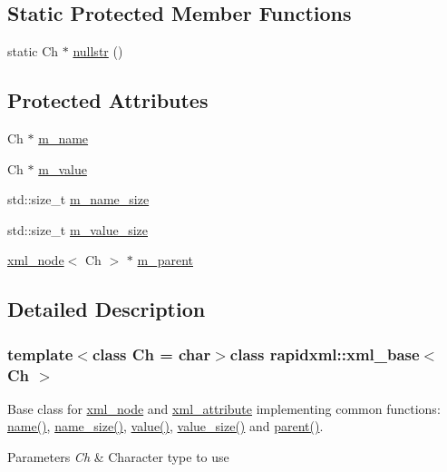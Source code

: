 \subsection*{Static Protected Member Functions}
\begin{DoxyCompactItemize}
\item 
static Ch $\ast$ \hyperlink{classrapidxml_1_1xml__base_ad96ff6b1e41dab3ff60b9bc4df769a75}{nullstr} ()
\end{DoxyCompactItemize}
\subsection*{Protected Attributes}
\begin{DoxyCompactItemize}
\item 
Ch $\ast$ \hyperlink{classrapidxml_1_1xml__base_afd9851ed43e14619db0d7075ef8e9e8a}{m\+\_\+name}
\item 
Ch $\ast$ \hyperlink{classrapidxml_1_1xml__base_a278a1ea63b0b70219b946cec47fa00ea}{m\+\_\+value}
\item 
std\+::size\+\_\+t \hyperlink{classrapidxml_1_1xml__base_a5a8c76a7274b4180213796422c4df76f}{m\+\_\+name\+\_\+size}
\item 
std\+::size\+\_\+t \hyperlink{classrapidxml_1_1xml__base_aa3a49d8ceddb8a8d7edb773a2226b89c}{m\+\_\+value\+\_\+size}
\item 
\hyperlink{singletonrapidxml_1_1xml__node}{xml\+\_\+node}$<$ Ch $>$ $\ast$ \hyperlink{classrapidxml_1_1xml__base_a90d5f660f078f66563fd7b2d8387ccb0}{m\+\_\+parent}
\end{DoxyCompactItemize}


\subsection{Detailed Description}
\subsubsection*{template$<$class Ch = char$>$class rapidxml\+::xml\+\_\+base$<$ Ch $>$}

Base class for \hyperlink{singletonrapidxml_1_1xml__node}{xml\+\_\+node} and \hyperlink{singletonrapidxml_1_1xml__attribute}{xml\+\_\+attribute} implementing common functions\+: \hyperlink{classrapidxml_1_1xml__base_a9a09739310469995db078ebd0da3ed45}{name()}, \hyperlink{classrapidxml_1_1xml__base_a7e7f98b3d01e1eab8dc1ca69aad9af84}{name\+\_\+size()}, \hyperlink{classrapidxml_1_1xml__base_adcdaccff61c665f039d9344e447b7445}{value()}, \hyperlink{classrapidxml_1_1xml__base_a9fcf201ed0915ac18dd43b0b5dcfaf32}{value\+\_\+size()} and \hyperlink{classrapidxml_1_1xml__base_a7f31ae930f93852830234db1ae59c4c4}{parent()}. 
\begin{DoxyParams}{Parameters}
{\em Ch} & Character type to use \\
\hline
\end{DoxyParams}


